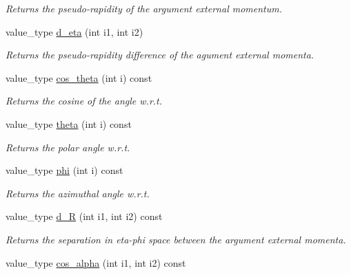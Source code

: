\begin{DoxyCompactItemize}
\begin{DoxyCompactList}\small\item\em Returns the pseudo-\/rapidity of the argument external momentum. \end{DoxyCompactList}\item 
\hypertarget{a00451_ab782f447ae0600fb2734cf4bbbb054ed}{}value\+\_\+type \hyperlink{a00451_ab782f447ae0600fb2734cf4bbbb054ed}{d\+\_\+eta} (int i1, int i2)\label{a00451_ab782f447ae0600fb2734cf4bbbb054ed}

\begin{DoxyCompactList}\small\item\em Returns the pseudo-\/rapidity difference of the agument external momenta. \end{DoxyCompactList}\item 
value\+\_\+type \hyperlink{a00451_a3c250cdd85b2e8c2ccffa1ba428835b8}{cos\+\_\+theta} (int i) const 
\begin{DoxyCompactList}\small\item\em Returns the cosine of the angle w.\+r.\+t. \end{DoxyCompactList}\item 
value\+\_\+type \hyperlink{a00451_a2afb8172a5259681d1ddb6ccbaf7bf83}{theta} (int i) const 
\begin{DoxyCompactList}\small\item\em Returns the polar angle w.\+r.\+t. \end{DoxyCompactList}\item 
value\+\_\+type \hyperlink{a00451_a1cfa4357ba44653535724a0b37e6fb48}{phi} (int i) const 
\begin{DoxyCompactList}\small\item\em Returns the azimuthal angle w.\+r.\+t. \end{DoxyCompactList}\item 
\hypertarget{a00451_a9b4ba5347ce7d475525c1a217cafcf19}{}value\+\_\+type \hyperlink{a00451_a9b4ba5347ce7d475525c1a217cafcf19}{d\+\_\+\+R} (int i1, int i2) const \label{a00451_a9b4ba5347ce7d475525c1a217cafcf19}

\begin{DoxyCompactList}\small\item\em Returns the separation in eta-\/phi space between the argument external momenta. \end{DoxyCompactList}\item 
\hypertarget{a00451_a4dfb607cc3cb4c1844c5b4563d12eed1}{}value\+\_\+type \hyperlink{a00451_a4dfb607cc3cb4c1844c5b4563d12eed1}{cos\+\_\+alpha} (int i1, int i2) const \label{a00451_a4dfb607cc3cb4c1844c5b4563d12eed1}


\end{DoxyCompactItemize}
